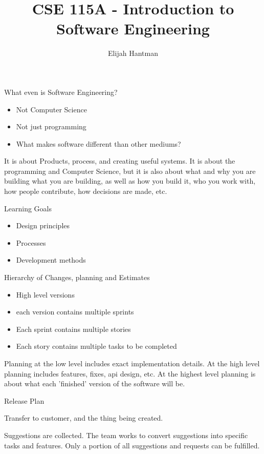 \documentclass{report}
\title{\Huge{CSE 115A - Introduction to Software Engineering}}
\author{\huge{Elijah Hantman}}
\date{}
\begin{document}
\maketitle
\newpage

What even is Software Engineering?
\begin{mdframed}
    \begin{itemize}
        \item Not Computer Science 
        \item Not just programming 
        \item What makes software different than other mediums?
    \end{itemize}

    It is about Products, process, and creating useful systems.
    It is about the programming and Computer Science, but it is
    also about what and why you are building what you are building,
    as well as how you build it, who you work with, how people contribute,
    how decisions are made, etc.

    Learning Goals
    \begin{itemize}
        \item Design principles
        \item Processes
        \item Development methods
    \end{itemize}
\end{mdframed}

Hierarchy of Changes, planning and Estimates
\begin{itemize}
    \item High level versions
    \item each version contains multiple sprints
    \item Each sprint contains multiple stories
    \item Each story contains multiple tasks to be completed
\end{itemize}

Planning at the low level includes exact implementation
details. At the high level planning includes features,
fixes, api design, etc. At the highest level planning is
about what each 'finished' version of the software will
be.


Release Plan
\begin{mdframed}
    Transfer to customer, and the thing being created.

    Suggestions are collected. The team works to convert
    suggestions into specific tasks and features. Only a portion
    of all suggestions and requests can be fulfilled.
\end{mdframed}
\end{document}
